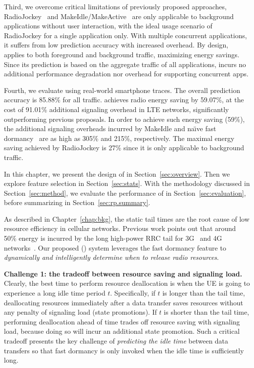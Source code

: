 Third, we overcome critical limitations of previously proposed approaches, \ie RadioJockey~\cite{radiojockey} and MakeIdle/MakeActive~\cite{makeidle} are only applicable to background applications without user interaction, with 
the ideal usage scenario of RadioJockey for a single application only. With multiple concurrent applications, it suffers from low prediction accuracy with increased overhead. By design, \NAME applies to both foreground and background traffic, maximizing energy savings. Since its prediction is based on the aggregate traffic of all applications, \NAME incurs no additional performance degradation nor overhead for supporting concurrent apps.


Fourth, we evaluate \NAME using real-world smartphone traces. The overall prediction accuracy is 85.88\% for all traffic. \NAME achieves radio energy saving by 59.07\%, at the cost of 91.01\% additional signaling overhead in LTE networks, significantly outperforming previous proposals. In order to achieve such energy saving (59\%), the additional signaling overheads incurred by MakeIdle and na\"{\i}ve fast dormancy~\cite{fast.dormancy.1, fast.dormancy.2} are as high as 305\% and 215\%, respectively. The maximal energy saving achieved by RadioJockey is 27\% since it is only applicable to background traffic.


In this chapter, we present the design of \NAME in Section~\ref{sec:overview}. Then we explore feature selection in Section~\ref{sec:stats}. With the methodology discussed in Section~\ref{sec:method}, we evaluate the performance of \NAME in Section~\ref{sec:evaluation}, before summarizing in Section~\ref{sec:rp.summary}.



\label{sec:overview}

As described in Chapter~\ref{chap:bkg}, the static tail times are the root cause of low resource efficiency in cellular networks. Previous work points out that around 50\% energy is incurred by the long high-power RRC tail for 3G~\cite{imc.3g} and 4G networks~\cite{huang_mobisys12}. Our proposed \NAMEFULL (\NAME) system leverages the fast dormancy feature to \emph{dynamically and intelligently determine when to release radio resources}.

\textbf{Challenge 1: the tradeoff between resource saving and signaling load.}
Clearly, the best time to perform resource deallocation is when the UE is going to experience a long idle time period $t$. Specifically, if $t$ is longer than the tail time, deallocating resources immediately after a data transfer saves resources without any penalty of signaling load (\ie state promotions). If $t$ is shorter than the tail time, performing deallocation ahead of time trades off resource saving with signaling load, because doing so will incur an additional state promotion. Such a critical tradeoff presents the key challenge of \emph{predicting the idle time} between data transfers so that fast dormancy is only invoked when the idle time is sufficiently long.

